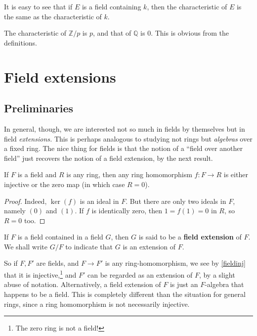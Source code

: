 It is easy to see that if $E$ is a field containing $k$, then the characteristic of
$E$ is the same as the characteristic of $k$. 

\begin{example} 
The characteristic of $\mathbb{Z}/p$ is $p$, and that of $\mathbb{Q}$ is $0$.
This is obvious from the definitions.
\end{example} 


\section{Field extensions}

\subsection{Preliminaries}

In general, though, we are interested not so much in fields by themselves but
in field \emph{extensions.} This is perhaps analogous to studying not rings
but \emph{algebras} over a fixed ring.
The nice thing for fields is that the notion of a ``field over another field''
just recovers the notion of a field extension, by the next result.

\begin{proposition} \label{fieldinj} If $F$ is a field and $R$ is any ring, then any ring homomorphism $f:F\rightarrow
R$ is either injective or the zero map (in which case $R=0$).
\end{proposition}

\begin{proof} Indeed, $\ker(f)$ is an ideal in
$F$. But there are only two ideals in $F$, namely $(0)$ and $(1)$. If $f$ is identically
zero, then $1=f(1)=0$ in $R$, so $R=0$ too.
\end{proof}

\begin{definition} If $F$ is a field contained in a field $G$, then $G$ is said
to be a \textbf{field extension} of $F$. We shall write $G/F$ to indicate
that  $G$ is an extension of $F$.
\end{definition}

So if $F, F'$ are fields, and $F \to F'$ is any ring-homomorphism, we see by 
\cref{fieldinj} that it is injective,\footnote{The zero ring is not a field!} and $F'$ can be regarded as an extension
of $F$, by a slight abuse of notation. Alternatively, a field extension of $F$
is just an $F$-algebra that happens to be a field.
This is completely different than the situation for general rings, since a
ring homomorphism is not necessarily injective. 

